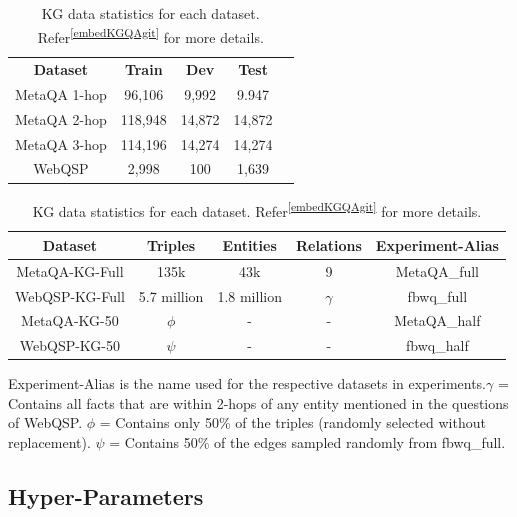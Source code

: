 \begin{table}[]
\centering
\begin{tabular}{c|c|c|cc}
\cline{1-4}
\textbf{Dataset} & \textbf{Train} & \textbf{Dev} & \textbf{Test} & \textbf{} \\ \cline{1-4}
MetaQA 1-hop     & 96,106         & 9,992        & 9.947         &           \\ \cline{1-4}
MetaQA 2-hop     & 118,948        & 14,872       & 14,872        &           \\ \cline{1-4}
MetaQA 3-hop     & 114,196        & 14,274       & 14,274        &           \\ \cline{1-4}
WebQSP           & 2,998          & 100          & 1,639         &           \\ \cline{1-4}
\end{tabular}
\caption{QA data statistics for each dataset according to \citep{saxena-etal-2020-improving}}
\label{dataset-qa-stats}

\begin{tabular}{c|c|c|c|c}
\hline
\textbf{Dataset} & \textbf{Triples} & \textbf{Entities} & \textbf{Relations} & \textbf{Experiment-Alias} \\ \hline
MetaQA-KG-Full   & 135k             & 43k               & 9                  & MetaQA\_full              \\ \hline
WebQSP-KG-Full   & 5.7 million      & 1.8 million       & $\gamma$           & fbwq\_full                \\ \hline
MetaQA-KG-50     & $\phi$           & -                 & -                  & MetaQA\_half              \\ \hline
WebQSP-KG-50     & $\psi$           & -                 & -                  & fbwq\_half                \\ \hline
\end{tabular}
\caption{KG data statistics for each dataset. Refer\textsuperscript{\ref{embedKGQAgit}} for more details.}Experiment-Alias is the name used for the respective datasets in experiments.\newline$\gamma$ = Contains all facts that are within 2-hops of any entity mentioned in the questions of WebQSP. \newline $\phi$ = Contains only 50\% of the triples (randomly selected without replacement). \newline $\psi$ = Contains 50\% of the edges sampled randomly from fbwq\_full.
\label{dataset-kg-stats}
\end{table}
\subsection{Hyper-Parameters}\label{sec:hyperparams}

